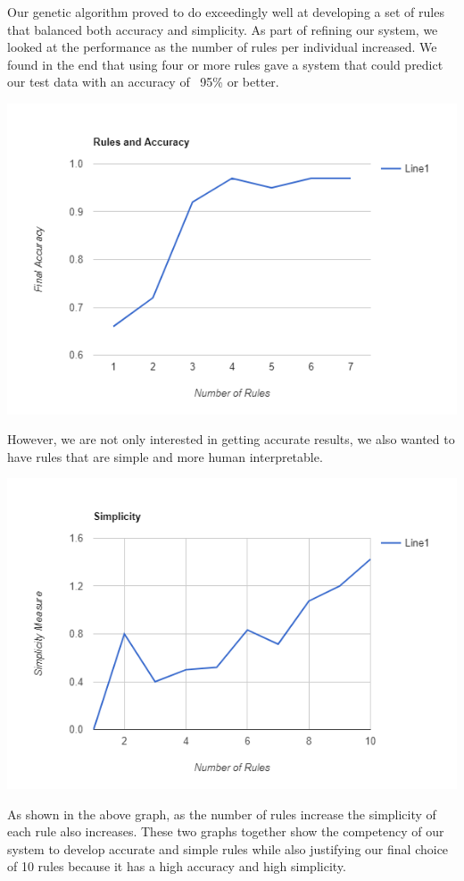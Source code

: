 \documentclass[a4paper,12pt]{article}
\begin{document}
Our genetic algorithm proved to do exceedingly well at developing a set of rules that balanced both accuracy and simplicity. As part of refining our system, we looked at the performance as the number of rules per individual increased. We found in the end that using four or more rules gave a system that could predict our test data with an accuracy of ~95\% or better.
\begin{center}
\includegraphics[scale=0.5]{accresult}
\end{center}
However, we are not only interested in getting accurate results, we also wanted to have rules that are simple and more human interpretable.
\begin{center}
\includegraphics[scale=0.5]{simresult.jpg}
\end{center}
As shown in the above graph, as the number of rules increase the simplicity of each rule also increases. These two graphs together show the competency of our system to develop accurate and simple rules while also justifying our final choice of 10 rules because it has a high accuracy and high simplicity.
\end{document}
